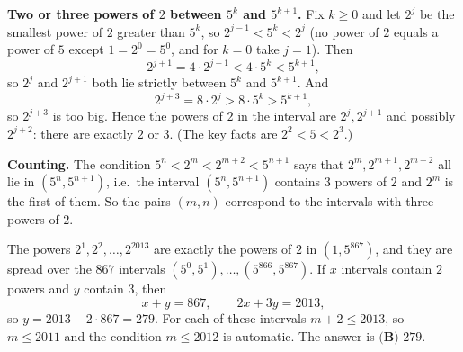 \textbf{Two or three powers of $2$ between $5^k$ and $5^{k+1}$.} Fix $k\ge0$ and let $2^j$ be the smallest power of $2$ greater than $5^k$, so $2^{j-1}<5^k<2^j$ (no power of $2$ equals a power of $5$ except $1=2^0=5^0$, and for $k=0$ take $j=1$). Then
\[
2^{j+1}=4\cdot2^{j-1}<4\cdot5^k<5^{k+1},
\]
so $2^j$ and $2^{j+1}$ both lie strictly between $5^k$ and $5^{k+1}$. And
\[
2^{j+3}=8\cdot2^j>8\cdot5^k>5^{k+1},
\]
so $2^{j+3}$ is too big. Hence the powers of $2$ in the interval are $2^j,2^{j+1}$ and possibly $2^{j+2}$: there are exactly $2$ or $3$. (The key facts are $2^2<5<2^3$.)

\textbf{Counting.} The condition $5^n<2^m<2^{m+2}<5^{n+1}$ says that $2^m,2^{m+1},2^{m+2}$ all lie in $(5^n,5^{n+1})$, i.e.\ the interval $(5^n,5^{n+1})$ contains $3$ powers of $2$ and $2^m$ is the first of them. So the pairs $(m,n)$ correspond to the intervals with three powers of $2$.

The powers $2^1,2^2,\dots,2^{2013}$ are exactly the powers of $2$ in $(1,5^{867})$, and they are spread over the $867$ intervals $(5^0,5^1),\dots,(5^{866},5^{867})$. If $x$ intervals contain $2$ powers and $y$ contain $3$, then
\[
x+y=867,\qquad 2x+3y=2013,
\]
so $y=2013-2\cdot867=279$. For each of these intervals $m+2\le2013$, so $m\le2011$ and the condition $m\le2012$ is automatic. The answer is $\boxed{\textbf{(B) }279}$.
